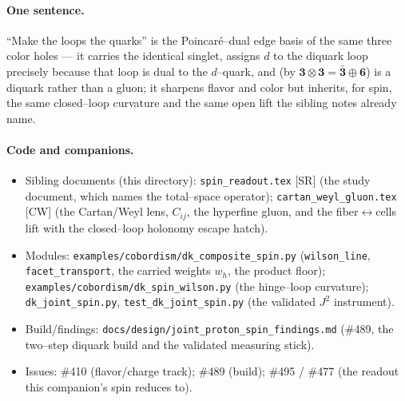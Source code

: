 \documentclass[11pt,oneside]{article}
\newcommand{\code}[1]{\texttt{#1}}
\newcommand{\bn}{\bar{\mathbf{3}}}
\newcommand{\thr}{\mathbf{3}}
\newcommand{\six}{\mathbf{6}}
\theoremstyle{plain}
\begin{document}
\paragraph{One sentence.} ``Make the loops the quarks'' is the Poincar\'e--dual
edge basis of the same three color holes --- it carries the identical singlet,
assigns $d$ to the diquark loop precisely because that loop is dual to the
$d$--quark, and (by $\thr\otimes\thr=\bn\oplus\six$) is a diquark rather than a
gluon; it sharpens flavor and color but inherits, for spin, the same closed--loop
curvature and the same open lift the sibling notes already name.

\paragraph{Code and companions.}
\begin{itemize}[leftmargin=1.6em]
  \item Sibling documents (this directory): \code{spin\_readout.tex} [SR] (the
        study document, which names the total--space operator);
        \code{cartan\_weyl\_gluon.tex} [CW] (the Cartan/Weyl lens, $C_{ij}$, the
        hyperfine gluon, and the fiber$\leftrightarrow$cells lift with the
        closed--loop holonomy escape hatch).
  \item Modules: \code{examples/cobordism/dk\_composite\_spin.py}
        (\code{wilson\_line}, \code{facet\_transport}, the carried weights $w_h$,
        the product floor); \code{examples/cobordism/dk\_spin\_wilson.py} (the
        hinge--loop curvature); \code{dk\_joint\_spin.py},
        \code{test\_dk\_joint\_spin.py} (the validated $J^2$ instrument).
  \item Build/findings: \code{docs/design/joint\_proton\_spin\_findings.md} (\#489,
        the two--step diquark build and the validated measuring stick).
  \item Issues: \#410 (flavor/charge track); \#489 (build); \#495 / \#477 (the
        readout this companion's spin reduces to).
\end{itemize}
\end{document}
